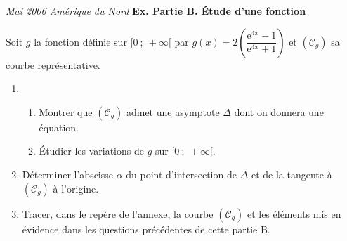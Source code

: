 \begin{exercice}

 \textsl{Mai 2006 Am\'erique du Nord}
\textbf{Ex.  Partie B. \'Etude d'une fonction}

\noindent Soit $g$ la fonction d\'efinie sur $[0~;~ + \infty[$ par $g(x) =  2\left(\dfrac{\text{e}^{4x} - 1}{\text{e}^{4x} + 1}\right)$  et $\left(\mathcal{C}_{g}\right)$ sa courbe repr\'esentative.
\begin{enumerate}
\item \begin{enumerate}
\item Montrer que $\left(\mathcal{C}_{g}\right)$ admet une asymptote $\Delta$ dont on donnera une \'equation.
\item \'Etudier les variations de $g$ sur $[0~;~ + \infty[$.
\end{enumerate}
\item D\'eterminer l'abscisse $\alpha$ du point d'intersection de $\Delta$ et de la tangente \`a $\left(\mathcal{C}_{g}\right)$ \`a l'origine.
\item Tracer, dans le rep\`ere de l'annexe,  la courbe $\left(\mathcal{C}_{g}\right)$ et les \'el\'ements mis en \'evidence dans les questions pr\'ec\'edentes de cette partie B.
\end{enumerate}
\end{exercice}
